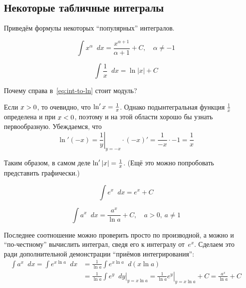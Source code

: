 \documentclass[a4paper,12pt]{article}
\newcommand{\diff}{\mathop{}\!d\!}
\begin{document}
  
  \subsection{Некоторые табличные интегралы}
  
  Приведём формулы некоторых ``популярных'' интегралов.
  
  \begin{equation}
    \int x^\alpha \diff x = \frac{x^{\alpha + 1}}{\alpha + 1} + C,\quad \alpha \not= -1
  \end{equation}
  
  \begin{equation}\label{eq:int-to-ln}
    \int \frac{1}{x} \diff x = \ln |x| + C
  \end{equation}
  
  \begin{remark}
    Почему справа в~\eqref{eq:int-to-ln} стоит модуль?
    
    Если $x \hm> 0$, то очевидно, что $\ln' x \hm= \frac{1}{x}$.
    Однако подынтегральная функция $\frac{1}{x}$ определена и при $x \hm< 0$, поэтому и на этой области хорошо бы узнать первообразную.
    Убеждаемся, что
    \[
      \ln'{(-x)} = \left.\frac{1}{y}\right|_{y = -x} \cdot (-x)' = \frac{1}{-x} \cdot -1 = \frac{1}{x}
    \]
    
    Таким образом, в самом деле $\ln'{|x|} \hm= \frac{1}{x}$.
    (Ещё это можно попробовать представить графически.)
  \end{remark}
  
  
  \begin{equation}
    \int e^x \diff x = e^x + C
  \end{equation}
  
  \begin{equation}
    \int a^x \diff x = \frac{a^x}{\ln a} + C,\quad a > 0,\ a \not= 1
  \end{equation}
  
  \begin{example}
    Последнее соотношение можно проверить просто по производной, а можно и ``по-честному'' вычислить интеграл, сведя его к интегралу от~$e^x$.
    Сделаем это ради дополнительной демонстрации ``приёмов интегрирования'':
    \begin{equation*}
    \begin{split}
      \int a^x \diff x = \int e^{x \ln a} \diff x &= \frac{1}{\ln a} \int e^{x \ln a} \diff (x \ln a)\\
        &= \frac{1}{\ln a} \left.\int e^{y} \diff y \right|_{y = x \ln a} = \left.\frac{1}{\ln a} e^{y}\right|_{y = x \ln a} + C
        = \frac{a^x}{\ln a} + C
    \end{split}
    \end{equation*}
  \end{example}
  
\end{document}
